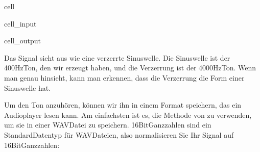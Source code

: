 \documentclass[letterpaper,10pt,english]{jupyterBook}
\begin{document}
\begin{sphinxuseclass}{cell}\begin{sphinxVerbatimInput}

\begin{sphinxuseclass}{cell_input}
\begin{sphinxVerbatim}[commandchars=\\\{\}]
\PYG{p}{[}\PYG{p}{]} 
\end{sphinxVerbatim}

\end{sphinxuseclass}\end{sphinxVerbatimInput}
\begin{sphinxVerbatimOutput}

\begin{sphinxuseclass}{cell_output}
\noindent{}

\end{sphinxuseclass}\end{sphinxVerbatimOutput}

\end{sphinxuseclass}
\sphinxAtStartPar
Das Signal sieht aus wie eine verzerrte Sinuswelle. Die Sinuswelle ist der 400\sphinxhyphen{}Hz\sphinxhyphen{}Ton, den wir erzeugt haben, und die Verzerrung ist der 4000\sphinxhyphen{}Hz\sphinxhyphen{}Ton. Wenn man genau hinsieht, kann man erkennen, dass die Verzerrung die Form einer Sinuswelle hat.

\sphinxAtStartPar
Um den Ton anzuhören, können wir ihn in einem Format speichern, das ein Audioplayer lesen kann. Am einfachsten ist es, die Methode  von  zu verwenden, um sie in einer WAV\sphinxhyphen{}Datei zu speichern. 16\sphinxhyphen{}Bit\sphinxhyphen{}Ganzzahlen sind ein Standard\sphinxhyphen{}Datentyp für WAV\sphinxhyphen{}Dateien, also normalisieren Sie Ihr Signal auf 16\sphinxhyphen{}Bit\sphinxhyphen{}Ganzzahlen:
\end{document}
